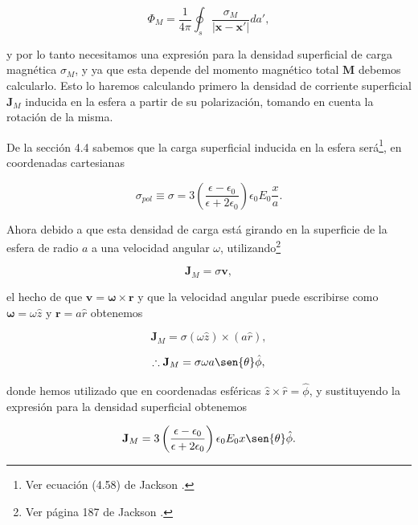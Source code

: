 \documentclass[a4paper,11pt]{article}
\numberwithin{equation}{section}
\begin{document}
\begin{equation}
 \Phi_M = \frac{1}{4\pi} \oint_s \frac{\sigma_M}{|\mathbf{x} - \mathbf{x'}|}da',
 \label{eq:potencialMagnetico}
\end{equation}

y por lo tanto necesitamos una expresión para la densidad superficial de carga magnética 
$\sigma_M$, y ya que esta depende del momento magnético total $\mathbf{M}$ debemos
calcularlo. Esto  lo haremos calculando primero la densidad de corriente superficial
 $\mathbf{J}_M$ inducida en la esfera a partir de su polarización, tomando en cuenta la rotación
de la misma.

\vspace{.3cm}

De la sección 4.4 sabemos que la carga superficial inducida en la esfera 
será\footnote{Ver ecuación (4.58) de Jackson \cite{jackson}.}, en coordenadas 
cartesianas 

\begin{equation}
 \sigma_{pol} \equiv \sigma =  3 \left(\frac{\epsilon - \epsilon_0}{\epsilon + 2\epsilon_0}
 \right)\epsilon_0E_0 \frac{x}{a}.
\end{equation}

Ahora debido a que esta densidad de carga está girando en la superficie de la esfera 
de radio $a$ a una velocidad angular $\omega$, utilizando\footnote{Ver página 187 de 
Jackson \cite{jackson}.}

\begin{equation}
 \mathbf{J}_M = \sigma \mathbf{v},
\end{equation}

el hecho de que $\mathbf{v} = \pmb{\omega} \times \mathbf{r}$ y que la velocidad 
angular puede escribirse como $\pmb{\omega} = \omega \hat{z}$ y $\mathbf{r} = a
\hat{r}$ obtenemos 

\begin{equation}
 \mathbf{J}_M = \sigma (\omega \hat{z}) \times (a\hat{r}),
\end{equation}

\begin{equation}
 \therefore \mathbf{J}_M = \sigma \omega a \sen{\theta} \hat{\phi},
\end{equation}

donde hemos utilizado que en coordenadas esféricas $\hat{z} \times \hat{r} = \hat{\phi}$, 
y sustituyendo la expresión para la densidad superficial obtenemos

\begin{equation}
 \mathbf{J}_M = 3 \left(\frac{\epsilon - \epsilon_0}{\epsilon + 2\epsilon_0}
 \right)\epsilon_0E_0 x \sen{\theta} \hat{\phi}.
\end{equation}
\end{document}
